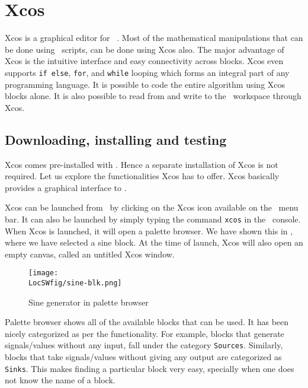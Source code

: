 \section{Xcos}
\label{sec:xcos-start}
Xcos is a graphical editor for \scilab\ \cite{xcos-ref}. Most of the
mathematical manipulations that can be done using \scilab\ scripts,
can be done using Xcos also.  The major advantage of Xcos is the
intuitive interface and easy connectivity across blocks. Xcos even
supports {\tt if else}, {\tt for}, and {\tt while} looping which forms
an integral part of any programming language. It is possible to code
the entire algorithm using Xcos blocks alone. It is also possible to
read from and write to the \scilab\ workspace through Xcos.

\subsection{Downloading, installing and testing}
Xcos comes pre-installed with \scilab. Hence a separate installation
of Xcos is not required. Let us explore the functionalities Xcos has
to offer. Xcos basically provides a graphical interface to \scilab.  

Xcos can be launched from \scilab\ by clicking on the Xcos icon
available on the \scilab\ menu bar. It can also be launched by simply
typing the command {\tt xcos} in the \scilab\ console. When Xcos is
launched, it will open a palette browser.  We have shown this in
, where we have selected a sine block.  At the time
of launch, Xcos will also open an empty canvas, called an untitled
Xcos window.

\begin{figure}
      \centering
      \texttt{[image: \\LocSWfig/sine-blk.png]}
      \caption{Sine generator in palette browser}
      \label{sine-blk}
\end{figure}




Palette browser shows all of the available blocks that can be used. It
has been nicely categorized as per the functionality. For example,
blocks that generate signals/values without any input, fall under the
category {\tt Sources}. Similarly, blocks that take signals/values
without giving any output are categorized as {\tt Sinks}. This makes
finding a particular block very easy, specially when one does not know
the name of a block.

